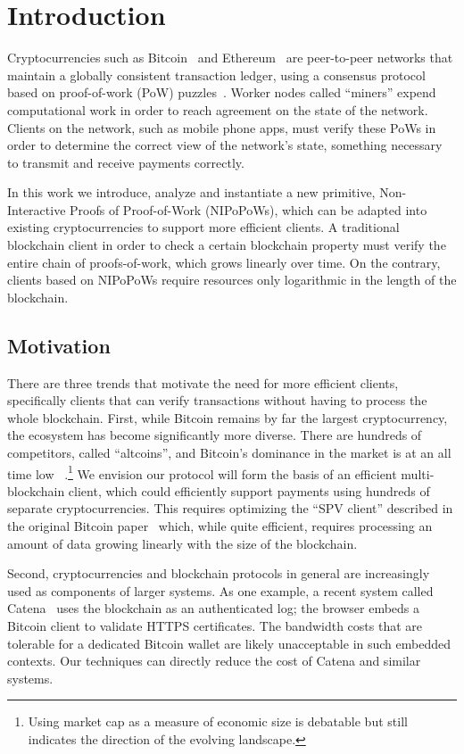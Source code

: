 \section{Introduction}

Cryptocurrencies such as Bitcoin~\cite{bitcoin}\cite{bitcoinsoftware} and
Ethereum~\cite{ethereum} are peer-to-peer networks that maintain a globally
consistent transaction ledger, using a consensus protocol based on proof-of-work
(PoW) puzzles~\cite{pow,hashcash}. Worker nodes called ``miners'' expend
computational work in order to reach agreement on the state of the network.
Clients on the network, such as mobile phone apps, must verify these
PoWs in order to determine the correct view of the network's state, something necessary
to transmit and receive payments correctly.

In this work we introduce, analyze and instantiate a new primitive,
Non-Interactive Proofs of Proof-of-Work (NIPoPoWs), which can be adapted into
existing cryptocurrencies to support more efficient clients. A traditional
blockchain client in order to check a certain blockchain property 
must verify the entire chain of proofs-of-work, which grows
linearly over time. On the contrary, clients based on NIPoPoWs require resources
only logarithmic in the length of the blockchain.

\subsection{Motivation}
There are three trends that motivate the need for more efficient clients,
specifically clients that can verify transactions without having to process the
whole blockchain. First, while Bitcoin remains by far the largest
cryptocurrency, the ecosystem has become significantly more diverse. There are
hundreds of competitors, called ``altcoins'', and Bitcoin's dominance in the
market is at an all time low ~\cite{marketcap}.\footnote{Using market cap as a
measure of economic size is debatable but still indicates the direction of the
evolving landscape.} We envision our protocol will form the basis of an
efficient multi-blockchain client, which could efficiently support payments
using hundreds of separate cryptocurrencies. This requires optimizing the ``SPV
client'' described in the original Bitcoin paper~\cite{bitcoin} which, while
quite efficient, requires processing an amount of data growing linearly with the
size of the blockchain.

Second, cryptocurrencies and blockchain protocols in general
are increasingly used as components of larger systems. As one example, a recent system called
Catena~\cite{catena} uses the blockchain as an authenticated log; the browser
embeds a Bitcoin client to validate HTTPS certificates. The bandwidth costs that
are tolerable for a dedicated Bitcoin wallet are likely unacceptable in such
embedded contexts. Our techniques can directly reduce the cost of Catena and
similar systems.

